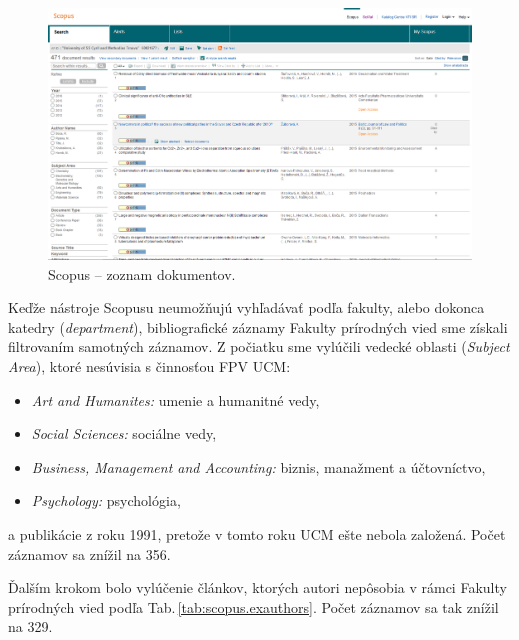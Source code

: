 \begin{figure}
  \centering
  \includegraphics[width=\textwidth]{obr/scopus04-cut.jpg}
  \caption{Scopus -- zoznam dokumentov.}
  \label{fig:scopus.documentlist}
\end{figure}

Keďže nástroje Scopusu neumožňujú vyhľadávať podľa fakulty, alebo dokonca
katedry (\emph{department}), bibliografické záznamy Fakulty prírodných vied sme
získali filtrovaním samotných záznamov. Z počiatku sme vylúčili vedecké oblasti
(\emph{Subject Area}), ktoré nesúvisia s činnosťou FPV UCM:
\begin{itemize}

\item \emph{Art and Humanites:} umenie a humanitné vedy,

\item \emph{Social Sciences:} sociálne vedy,

\item \emph{Business, Management and Accounting:} biznis, manažment a
  účtovníctvo,

\item \emph{Psychology:} psychológia,

\end{itemize}
a publikácie z roku 1991, pretože v tomto roku UCM ešte nebola založená. Počet
záznamov sa znížil na 356.

Ďalším krokom bolo vylúčenie článkov, ktorých autori nepôsobia v rámci Fakulty
prírodných vied podľa Tab.\,\ref{tab:scopus.exauthors}.  Počet záznamov sa
tak znížil na 329.

